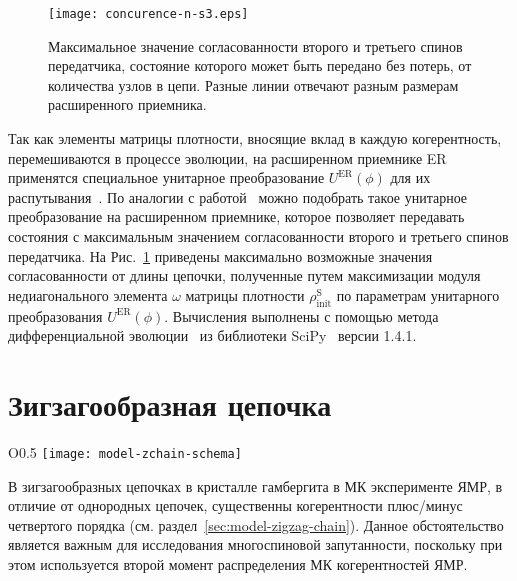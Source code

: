 \begin{figure}[H]
    \centering
    \texttt{[image: concurence-n-s3.eps]}
    \caption{
      Максимальное значение согласованности второго и третьего спинов передатчика, состояние которого может быть передано без потерь,
      от количества узлов в цепи.
      Разные линии отвечают разным размерам расширенного приемника.
    }
    \label{fig:concurence-n-s3}
\end{figure}


Так как элементы матрицы плотности, вносящие вклад в каждую когерентность, перемешиваются в процессе эволюции,
на расширенном приемнике ER применятся специальное унитарное преобразование $U^\mathrm{ER}(\phi)$ для их распутывания~\cite{Feldman2017}.
По аналогии с работой~\cite{Bochkin2022} можно подобрать такое унитарное преобразование на расширенном приемнике,
которое позволяет передавать состояния с максимальным значением согласованности второго и третьего спинов передатчика.
На Рис.~\ref{fig:concurence-n-s3} приведены максимально возможные значения согласованности от длины цепочки,
полученные путем максимизации модуля недиагонального элемента $\omega$ матрицы плотности $\rho^\mathrm{S}_\mathrm{init}$ по параметрам унитарного преобразования $U^\mathrm{ER}(\phi)$.
Вычисления выполнены с помощью метода дифференциальной эволюции~\cite{Storn1997,Wormington1999,Lampinen2002} из библиотеки SciPy~\cite{SciPy} версии 1.4.1.


\section{Зигзагообразная цепочка}

\begin{wrapfigure}{O}{0.5\textwidth}
    \centering
    \texttt{[image: model-zchain-schema]}
    \caption{\protect}
    \label{fig:model-zchain-schema}
\end{wrapfigure}

В зигзагообразных цепочках в кристалле гамбергита в МК эксперименте ЯМР,
в отличие от однородных цепочек,
существенны когерентности плюс/минус четвертого порядка (см. раздел~\ref{sec:model-zigzag-chain}).
Данное обстоятельство является важным для исследования многоспиновой запутанности,
поскольку при этом используется второй момент распределения МК когерентностей ЯМР.

